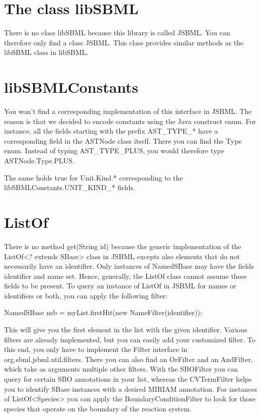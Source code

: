 \section{The class libSBML}

There is no class libSBML because this library is called JSBML. You
can therefore only find a class JSBML. This class provides similar
methods as the libSBML class in libSBML.

\section{libSBMLConstants}

You won't find a corresponding implementation of this interface in 
JSBML. The reason is that we decided to encode constants using the
Java construct enum. For instance, all the fields starting with the
prefix AST_TYPE_* have a corresponding field in the ASTNode class itself.
There you can find the Type enum. Instead of typing AST_TYPE_PLUS, you
would therefore type ASTNode.Type.PLUS.

The same holds true for Unit.Kind.* corresponding to the 
libSBMLConstants.UNIT_KIND_* fields.

\section{ListOf}

There is no method get(String id) because the generic implementation of 
the ListOf<? extends SBase> class in JSBML excepts also elements that do 
not necessarily have an identifier. Only instances of NamedSBase may have
the fields identifier and name set. Hence, generally, the ListOf class 
cannot assume these fields to be present. To query an instance of ListOf 
in JSBML for names or identifiers or both, you can apply the following 
filter:

NamedSBase nsb = myList.firstHit(new NameFilter(identifier));

This will give you the first element in the list with the given identifier.
Various filters are already implemented, but you can easily add your 
customized filter. To this end, you only have to implement the Filter 
interface in org.sbml.jsbml.util.filters. There you can also find an
OrFilter and an AndFilter, which take as arguments multiple other filters.
With the SBOFilter you can query for certain SBO annotations in your list,
whereas the CVTermFilter helps you to identify SBase instances with a
desired MIRIAM annotation. For instances of ListOf<Species> you can apply
the BoundaryConditionFilter to look for those species that operate on the
boundary of the reaction system.



